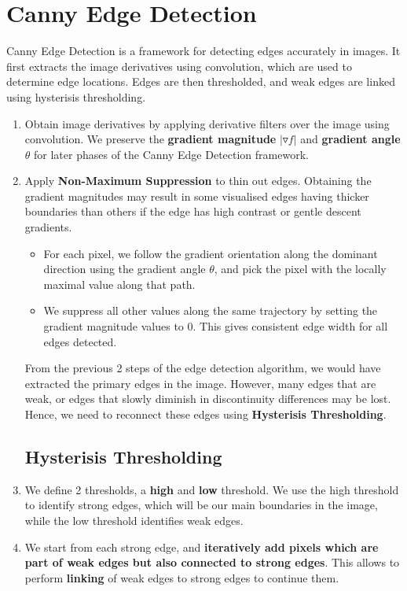 \documentclass[12pt]{article}
\begin{document}
\section{Canny Edge Detection}

Canny Edge Detection is a framework for detecting edges accurately in images. It first extracts the image derivatives using convolution, which are used to determine edge locations. Edges are then thresholded, and weak edges are linked using hysterisis thresholding.
\begin{enumerate}
\item Obtain image derivatives by applying derivative filters over the image using convolution. We preserve the \textbf{gradient magnitude} $|\triangledown f |$ and \textbf{gradient angle} $\theta$ for later phases of the Canny Edge Detection framework.

\item Apply \textbf{Non-Maximum Suppression} to thin out edges. Obtaining the gradient magnitudes may result in some visualised edges having thicker boundaries than others if the edge has high contrast or gentle descent gradients. 
\begin{itemize}
\item For each pixel, we follow the gradient orientation along the dominant direction using the gradient angle $\theta$, and pick the pixel with the locally maximal value along that path.
\item We suppress all other values along the same trajectory by setting the gradient magnitude values to 0. This gives consistent edge width for all edges detected.
\end{itemize}

From the previous 2 steps of the edge detection algorithm, we would have extracted the primary edges in the image. However, many edges that are weak, or edges that slowly diminish in discontinuity differences may be lost. Hence, we need to reconnect these edges using \textbf{Hysterisis Thresholding}.\\

\subsection{Hysterisis Thresholding}

\item We define 2 thresholds, a \textbf{high} and \textbf{low} threshold. We use the high threshold to identify strong edges, which will be our main boundaries in the image, while the low threshold identifies weak edges.
\item We start from each strong edge, and \textbf{iteratively add pixels which are part of weak edges but also connected to strong edges}. This allows to perform \textbf{linking} of weak edges to strong edges to continue them.

\end{enumerate}
\end{document}
